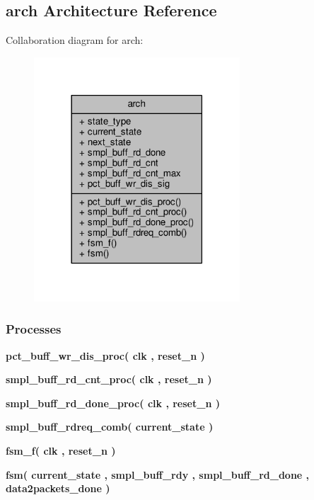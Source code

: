 \subsection{arch Architecture Reference}
\label{classdata2packets__fsm_1_1arch}


Collaboration diagram for arch\+:\nopagebreak
\begin{figure}[H]
\begin{center}
\leavevmode
\includegraphics[width=218pt]{d4/d29/classdata2packets__fsm_1_1arch__coll__graph}
\end{center}
\end{figure}
\subsubsection*{Processes}
 \begin{DoxyCompactItemize}
\item 
{\bf pct\+\_\+buff\+\_\+wr\+\_\+dis\+\_\+proc}{\bfseries  ( {\bfseries {\bfseries {\bf clk}} \textcolor{vhdlchar}{ }} , {\bfseries {\bfseries {\bf reset\+\_\+n}} \textcolor{vhdlchar}{ }} )}
\item 
{\bf smpl\+\_\+buff\+\_\+rd\+\_\+cnt\+\_\+proc}{\bfseries  ( {\bfseries {\bfseries {\bf clk}} \textcolor{vhdlchar}{ }} , {\bfseries {\bfseries {\bf reset\+\_\+n}} \textcolor{vhdlchar}{ }} )}
\item 
{\bf smpl\+\_\+buff\+\_\+rd\+\_\+done\+\_\+proc}{\bfseries  ( {\bfseries {\bfseries {\bf clk}} \textcolor{vhdlchar}{ }} , {\bfseries {\bfseries {\bf reset\+\_\+n}} \textcolor{vhdlchar}{ }} )}
\item 
{\bf smpl\+\_\+buff\+\_\+rdreq\+\_\+comb}{\bfseries  ( {\bfseries {\bfseries {\bf current\+\_\+state}} \textcolor{vhdlchar}{ }} )}
\item 
{\bf fsm\+\_\+f}{\bfseries  ( {\bfseries {\bfseries {\bf clk}} \textcolor{vhdlchar}{ }} , {\bfseries {\bfseries {\bf reset\+\_\+n}} \textcolor{vhdlchar}{ }} )}
\item 
{\bf fsm}{\bfseries  ( {\bfseries {\bfseries {\bf current\+\_\+state}} \textcolor{vhdlchar}{ }} , {\bfseries {\bfseries {\bf smpl\+\_\+buff\+\_\+rdy}} \textcolor{vhdlchar}{ }} , {\bfseries {\bfseries {\bf smpl\+\_\+buff\+\_\+rd\+\_\+done}} \textcolor{vhdlchar}{ }} , {\bfseries {\bfseries {\bf data2packets\+\_\+done}} \textcolor{vhdlchar}{ }} )}
\end{DoxyCompactItemize}
